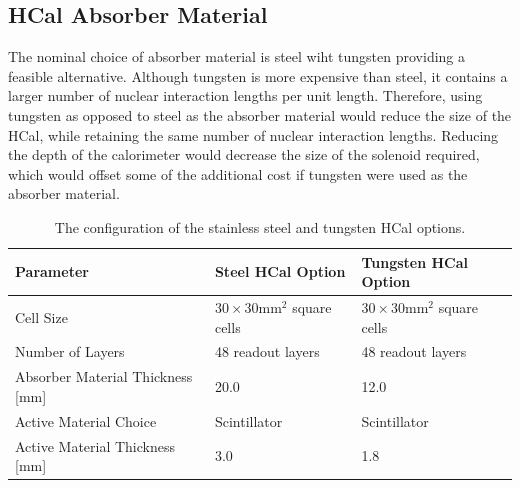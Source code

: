
\subsection{HCal Absorber Material}
\label{sec:hcalabsorbermaterial}

The nominal choice of absorber material is steel wiht tungsten providing a feasible alternative.  Although tungsten is more expensive than steel, it contains a larger number of nuclear interaction lengths per unit length.  Therefore, using tungsten as opposed to steel as the absorber material would reduce the size of the HCal, while retaining the same number of nuclear interaction lengths.  Reducing the depth of the calorimeter would decrease the size of the solenoid required, which would offset some of the additional cost if tungsten were used as the absorber material. 

\begin{table}[h!]
\centering
\begin{tabular}{ l l l }
\hline
Parameter & Steel HCal Option & Tungsten HCal Option \\
\hline
Cell Size & $30 \times 30 \text{mm}^{2}$ square cells & $30 \times 30 \text{mm}^{2}$ square cells\\
Number of Layers & 48 readout layers & 48 readout layers\\
Absorber Material Thickness [mm] & 20.0 & 12.0 \\
Active Material Choice & Scintillator & Scintillator \\
Active Material Thickness [mm] & 3.0 & 1.8 \\
\hline
\end{tabular}
\caption[The configuration of the stainless steel and tungsten HCal options.]{The configuration of the stainless steel and tungsten HCal options.}
\label{table:hcalabsmaterial}
\end{table}

